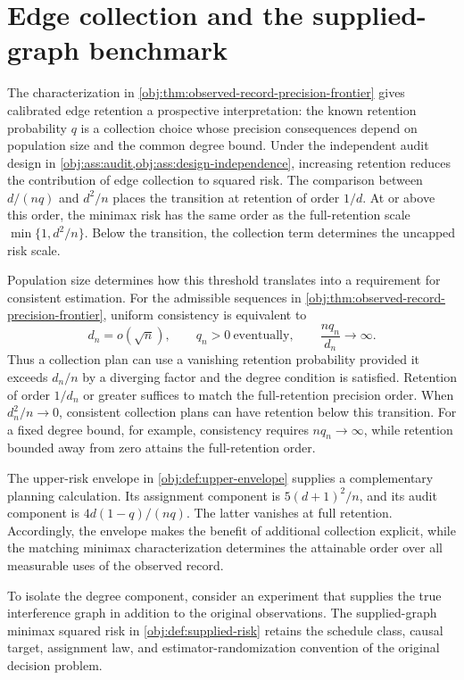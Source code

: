 \section{Edge collection and the supplied-graph benchmark}

The characterization in \cref{obj:thm:observed-record-precision-frontier} gives calibrated edge retention a prospective interpretation: the known retention probability \(q\) is a collection choice whose precision consequences depend on population size and the common degree bound. Under the independent audit design in \cref{obj:ass:audit,obj:ass:design-independence}, increasing retention reduces the contribution of edge collection to squared risk. The comparison between \(d/(nq)\) and \(d^2/n\) places the transition at retention of order \(1/d\). At or above this order, the minimax risk has the same order as the full-retention scale \(\min\{1,d^2/n\}\). Below the transition, the collection term determines the uncapped risk scale.

Population size determines how this threshold translates into a requirement for consistent estimation. For the admissible sequences in \cref{obj:thm:observed-record-precision-frontier}, uniform consistency is equivalent to
\[
d_n=o(\sqrt n),
\qquad
q_n>0\ \text{eventually},
\qquad
\frac{nq_n}{d_n}\longrightarrow\infty.
\]
Thus a collection plan can use a vanishing retention probability provided it exceeds \(d_n/n\) by a diverging factor and the degree condition is satisfied. Retention of order \(1/d_n\) or greater suffices to match the full-retention precision order. When \(d_n^2/n\to0\), consistent collection plans can have retention below this transition. For a fixed degree bound, for example, consistency requires \(nq_n\to\infty\), while retention bounded away from zero attains the full-retention order.

The upper-risk envelope in \cref{obj:def:upper-envelope} supplies a complementary planning calculation. Its assignment component is \(5(d+1)^2/n\), and its audit component is \(4d(1-q)/(nq)\). The latter vanishes at full retention. Accordingly, the envelope makes the benefit of additional collection explicit, while the matching minimax characterization determines the attainable order over all measurable uses of the observed record.

To isolate the degree component, consider an experiment that supplies the true interference graph in addition to the original observations. The supplied-graph minimax squared risk  in \cref{obj:def:supplied-risk} retains the schedule class, causal target, assignment law, and estimator-randomization convention of the original decision problem.

